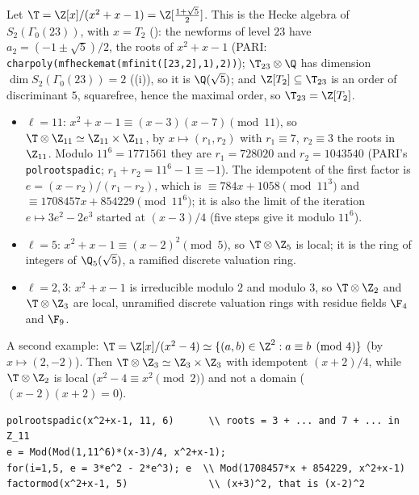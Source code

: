 \begin{example}\label{ex:modules:level23}
Let $\T=\Z[x]/(x^2+x-1)=\Z[\frac{1+\sqrt5}2]$. This is the Hecke algebra of $S_2(\Gamma_0(23))$, with $x=T_2$ (): the newforms of level $23$ have
$a_2=(-1\pm\sqrt5)/2$, the roots of $x^2+x-1$ (PARI: \texttt{charpoly(mfheckemat(mfinit([23,2],1),2))}); $\T_{23}\otimes\Q$ has dimension
$\dim S_2(\Gamma_0(23))=2$ ((i)), so it is $\Q(\sqrt5)$; and $\Z[T_2]\subseteq\T_{23}$ is an order of discriminant $5$, squarefree,
hence the maximal order, so $\T_{23}=\Z[T_2]$.
\begin{itemize}
\item $\ell=11$: $x^2+x-1\equiv(x-3)(x-7)\pmod{11}$, so $\T\otimes\Z_{11}\simeq\Z_{11}\times\Z_{11}$, by $x\mapsto(r_1,r_2)$ with $r_1\equiv7$, $r_2\equiv3$ the roots in $\Z_{11}$.
Modulo $11^6=1771561$ they are $r_1=728020$ and $r_2=1043540$ (PARI's \texttt{polrootspadic}; $r_1+r_2=11^6-1\equiv-1$). The idempotent of the first
factor is $e=(x-r_2)/(r_1-r_2)$, which is $\equiv784x+1058\pmod{11^3}$ and $\equiv1708457x+854229\pmod{11^6}$; it is also the limit of the iteration
$e\mapsto3e^2-2e^3$ started at $(x-3)/4$ (five steps give it modulo $11^6$).
\item $\ell=5$: $x^2+x-1\equiv(x-2)^2\pmod5$, so $\T\otimes\Z_5$ is local; it is the ring of integers of $\Q_5(\sqrt5)$, a ramified discrete valuation ring.
\item $\ell=2,3$: $x^2+x-1$ is irreducible modulo $2$ and modulo $3$, so $\T\otimes\Z_2$ and $\T\otimes\Z_3$ are local, unramified discrete valuation rings with residue
fields $\F_4$ and $\F_9$.
\end{itemize}
A second example: $\T=\Z[x]/(x^2-4)\simeq\{(a,b)\in\Z^2:a\equiv b\pmod4\}$ (by $x\mapsto(2,-2)$). Then $\T\otimes\Z_3\simeq\Z_3\times\Z_3$ with idempotent $(x+2)/4$, while
$\T\otimes\Z_2$ is local ($x^2-4\equiv x^2\pmod2$) and not a domain ($(x-2)(x+2)=0$).
\begin{lstlisting}[language=GP]
polrootspadic(x^2+x-1, 11, 6)      \\ roots = 3 + ... and 7 + ... in Z_11
e = Mod(Mod(1,11^6)*(x-3)/4, x^2+x-1);
for(i=1,5, e = 3*e^2 - 2*e^3); e  \\ Mod(1708457*x + 854229, x^2+x-1)
factormod(x^2+x-1, 5)              \\ (x+3)^2, that is (x-2)^2
\end{lstlisting}
\end{example}


